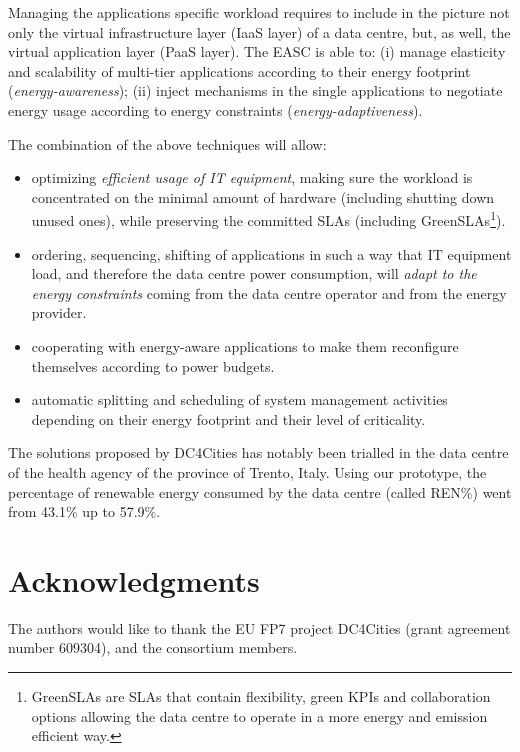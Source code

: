 \documentclass[conference]{IEEEtran}
\begin{document}
Managing the applications specific workload requires to include in the picture not only the virtual infrastructure layer (IaaS layer) of a data centre, but, as well, the virtual application layer (PaaS layer).
The EASC is able to: (i) manage elasticity and scalability of multi-tier applications according to their energy footprint (\emph{energy-awareness}); (ii) inject mechanisms in the single applications to negotiate energy usage according to energy constraints (\emph{energy-adaptiveness}).

The combination of the above techniques will allow:
\begin{itemize}
  \item optimizing \emph{efficient usage of IT equipment}, making sure the workload is concentrated on the minimal amount of hardware (including shutting down unused ones), while preserving the committed SLAs (including GreenSLAs\footnote{GreenSLAs are SLAs that contain flexibility, green KPIs and collaboration options allowing the data centre to operate in a more energy and emission efficient way.}).
  \item ordering, sequencing, shifting of applications in such a way that IT equipment load, and therefore the data centre power consumption, will \emph{adapt to the energy constraints} coming from the data centre operator and from the energy provider.
  \item cooperating with energy-aware applications to make them reconfigure themselves according to power budgets.
  \item automatic splitting and scheduling of system management activities depending on their energy footprint and their level of criticality.
\end{itemize}

The solutions proposed by DC4Cities has notably been trialled in the data centre of the health agency of the province of Trento, Italy.
Using our prototype, the percentage of renewable energy consumed by the data centre (called REN\%) went from 43.1\% up to 57.9\%. 


\section{Acknowledgments}
The authors would like to thank the EU FP7 project DC4Cities (grant agreement number 609304), and the consortium members.


 
\end{document}
